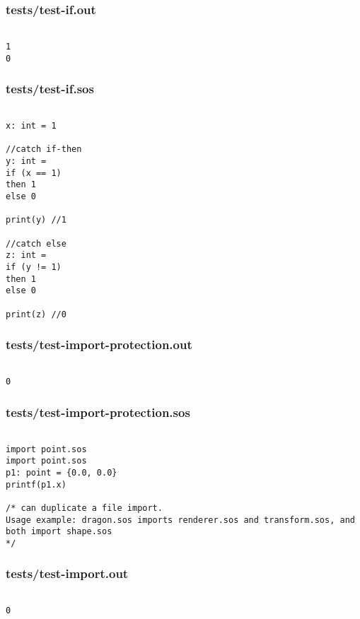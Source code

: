 \documentclass[main.tex]{subfiles}
\begin{document}
\subsubsection{tests/test-if.out}

\begin{lstlisting}

1
0
\end{lstlisting}

\subsubsection{tests/test-if.sos}

\begin{lstlisting}

x: int = 1

//catch if-then
y: int = 
if (x == 1)
then 1
else 0

print(y) //1

//catch else
z: int = 
if (y != 1)
then 1
else 0

print(z) //0

\end{lstlisting}

\subsubsection{tests/test-import-protection.out}

\begin{lstlisting}

0
\end{lstlisting}

\subsubsection{tests/test-import-protection.sos}

\begin{lstlisting}

import point.sos
import point.sos 
p1: point = {0.0, 0.0} 
printf(p1.x)

/* can duplicate a file import.
Usage example: dragon.sos imports renderer.sos and transform.sos, and both import shape.sos
*/
\end{lstlisting}

\subsubsection{tests/test-import.out}

\begin{lstlisting}

0
\end{lstlisting}
\end{document}
